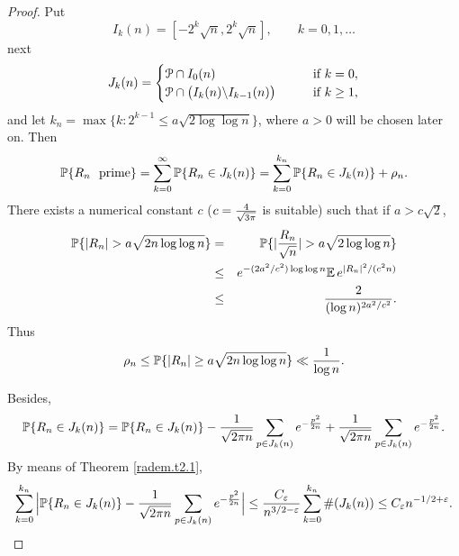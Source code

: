\documentclass[11pt,draft,reqno]{amsart}
\theoremstyle{definition}
\theoremstyle{remarks}
\numberwithin{equation}{section}
\def \e{{\varepsilon}}
\def \qq{{\qquad}}
\def\P{{\mathcal P}}
\def\E{{\mathbb E \,}}
\def\P{{\mathbb P}}
\begin{document}
\begin{proof}
Put  
$$I_k(n) =[-2^{ k}\sqrt n, 2^{ k}\sqrt n], \qq k=0,1,\ldots $$
next 
\begin{equation} \label{jkn}
  J_k(n)=  \begin{cases}  {\mathcal P}\cap  I_0(n) & \qq \hbox{if $k=0$},\cr         {\mathcal P}\cap\big(I_k(n) \backslash I_{k-1}(n) \big)  & \qq \hbox{if $k\ge 1 $},\end{cases}
\end{equation} 
and let  $k_n= \max\{ k: 2^{k-1}\le
a \sqrt{ 2\log \log n} \}$, where $a>0$ will be  chosen later on. 
Then 
$$\P\{R_n\ \hbox{ prime} \}=\sum_{k=0}^\infty \P\{R_n\in  J_k(n) \}=\sum_{k=0}^{k_n} \P\{R_n\in  J_k(n) \}+\rho_n . $$
There exists a numerical constant $c$ ($c={4 \over \sqrt {3\pi} }$ is suitable) such that if $a>c\sqrt 2$, 
\begin{eqnarray*} \P\{  |R_n|> a\sqrt{2 n\log \log n}\}
&=&\P\{  |{R_n\over \sqrt n }|> a\sqrt{2  \log \log n}\}
\cr  & \le &e^{ -(2a^2/c^2) \log \log
n}\E e^{ {|R_n|^2/(
 c^2 n )}}  
 \cr  & \le & {2\over (\log n)^{2a^2/c^2}} .
 \end{eqnarray*} 
Thus
$$\rho_n\le \P\{|R_n|\ge a\sqrt{2n\log\log n}\} \ll {1\over  \log n  }. $$

Besides, 
$$\P\{R_n\in  J_k(n) \}= \P\{R_n\in  J_k(n) \}- {1\over  \sqrt{ 2\pi n}} \sum_{p\in  J_k(n)}e^{-  {p^2\over  2 n } }+{1\over  \sqrt{ 2\pi n}} \sum_{p\in 
J_k(n)}e^{-  {p^2\over  2 n } }.$$
By means of Theorem \ref{radem.t2.1}, 
$$\sum_{k=0}^{k_n}\Big|\P\{R_n\in  J_k(n) \} - {1\over  \sqrt{ 2\pi n}} \sum_{p\in  J_k(n)}e^{-  {p^2\over  2 n } }\Big|  \le   {C_\e\over n^{  
   3/2-\e }} \sum_{k=0}^{k_n}\#(
J_k(n)) \le C_\e   n^{  
   -1/2+\e }.$$
 

\end{proof}
\end{document}
